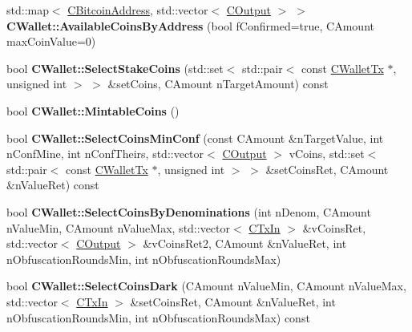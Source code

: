 \begin{DoxyCompactItemize}
std\+::map$<$ \mbox{\hyperlink{class_c_bitcoin_address}{C\+Bitcoin\+Address}}, std\+::vector$<$ \mbox{\hyperlink{class_c_output}{C\+Output}} $>$ $>$ {\bfseries C\+Wallet\+::\+Available\+Coins\+By\+Address} (bool f\+Confirmed=true, C\+Amount max\+Coin\+Value=0)
\item 
\mbox{\label{group___actions_gafdc9becbee910eb3115cb14e6964c59b}} 
bool {\bfseries C\+Wallet\+::\+Select\+Stake\+Coins} (std\+::set$<$ std\+::pair$<$ const \mbox{\hyperlink{class_c_wallet_tx}{C\+Wallet\+Tx}} $\ast$, unsigned int $>$ $>$ \&set\+Coins, C\+Amount n\+Target\+Amount) const
\item 
\mbox{\label{group___actions_ga7d21c44ded441fedfc3754003ba087ce}} 
bool {\bfseries C\+Wallet\+::\+Mintable\+Coins} ()
\item 
\mbox{\label{group___actions_gad6172164bad4b56aca54570f41a4375f}} 
bool {\bfseries C\+Wallet\+::\+Select\+Coins\+Min\+Conf} (const C\+Amount \&n\+Target\+Value, int n\+Conf\+Mine, int n\+Conf\+Theirs, std\+::vector$<$ \mbox{\hyperlink{class_c_output}{C\+Output}} $>$ v\+Coins, std\+::set$<$ std\+::pair$<$ const \mbox{\hyperlink{class_c_wallet_tx}{C\+Wallet\+Tx}} $\ast$, unsigned int $>$ $>$ \&set\+Coins\+Ret, C\+Amount \&n\+Value\+Ret) const
\item 
\mbox{\label{group___actions_gaeee6784500935f0fe9226620bd5ad62f}} 
bool {\bfseries C\+Wallet\+::\+Select\+Coins\+By\+Denominations} (int n\+Denom, C\+Amount n\+Value\+Min, C\+Amount n\+Value\+Max, std\+::vector$<$ \mbox{\hyperlink{class_c_tx_in}{C\+Tx\+In}} $>$ \&v\+Coins\+Ret, std\+::vector$<$ \mbox{\hyperlink{class_c_output}{C\+Output}} $>$ \&v\+Coins\+Ret2, C\+Amount \&n\+Value\+Ret, int n\+Obfuscation\+Rounds\+Min, int n\+Obfuscation\+Rounds\+Max)
\item 
\mbox{\label{group___actions_ga845a617454b2b25387b16daa01d3bed7}} 
bool {\bfseries C\+Wallet\+::\+Select\+Coins\+Dark} (C\+Amount n\+Value\+Min, C\+Amount n\+Value\+Max, std\+::vector$<$ \mbox{\hyperlink{class_c_tx_in}{C\+Tx\+In}} $>$ \&set\+Coins\+Ret, C\+Amount \&n\+Value\+Ret, int n\+Obfuscation\+Rounds\+Min, int n\+Obfuscation\+Rounds\+Max) const
\item 
\mbox{\label{group___actions_ga50cab5ae40a0d771663dd3de34e0d47d}} 

\end{DoxyCompactItemize}
